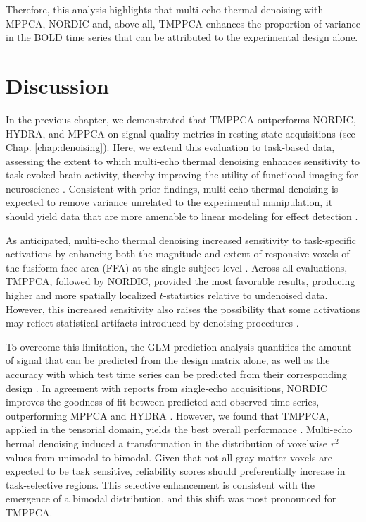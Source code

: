 Therefore, this analysis highlights that multi-echo thermal denoising with MPPCA, NORDIC and, above all, TMPPCA  enhances the proportion of variance in the BOLD time series that can be attributed to the experimental design alone. 


\section{Discussion}

In the previous chapter, we demonstrated that TMPPCA outperforms NORDIC, HYDRA, and MPPCA on signal quality metrics in resting‑state acquisitions (see Chap. \ref{chap:denoising}). Here, we extend this evaluation to task‑based data, assessing the extent to which multi-echo thermal denoising enhances sensitivity to task‑evoked brain activity, thereby improving the utility of functional imaging for neuroscience \citep{poldrackRegionInterestAnalysis2007}. Consistent with prior findings, multi-echo thermal denoising is expected to remove variance unrelated to the experimental manipulation, it should yield data that are more amenable to linear modeling for effect detection \citep{zhu2022denoise,comby2023denoising}.

As anticipated, multi-echo thermal denoising increased sensitivity to task‑specific activations by enhancing both the magnitude and extent of responsive voxels of the fusiform face area (FFA) at the single-subject level \citep{kanwisherFusiformFaceArea1997}. Across all evaluations, TMPPCA, followed by NORDIC, provided the most favorable results, producing higher and more spatially localized $t$‑statistics relative to undenoised data. However, this increased sensitivity also raises the possibility that some activations may reflect statistical artifacts introduced by denoising procedures \citep{kay2022riskL,fernandesMPPCADenoisingFMRI2023a}. 

To overcome this limitation, the GLM prediction analysis quantifies the amount of signal that can be predicted from the design matrix alone, as well as the accuracy with which test time series can be predicted from their corresponding design \citep{princeImprovingAccuracySingletrial2022}. In agreement with reports from single‑echo acquisitions, NORDIC improves the goodness of fit between predicted and observed time series, outperforming MPPCA and HYDRA \citep{dowdle2023evaluating}. However, we found that TMPPCA, applied in the tensorial domain, yields the best overall performance \citep{olesenTensorDenoisingMultidimensional2023}. Multi-echo hermal denoising induced a transformation in the distribution of voxelwise $r^2$ values from unimodal to bimodal. Given that not all gray‑matter voxels are expected to be task sensitive, reliability scores should preferentially increase in task‑selective regions. This selective enhancement is consistent with the emergence of a bimodal distribution, and this shift was most pronounced for TMPPCA.

